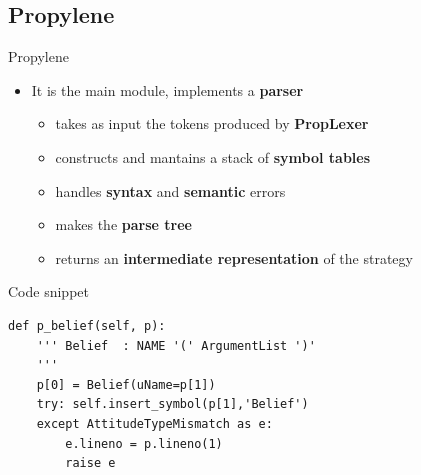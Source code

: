 \subsection{Propylene}
\begin{frame}[fragile]{Propylene}
  \begin{itemize}
  \item It is the main module, implements a {\bf parser}
    \begin{itemize}
    \item takes as input the tokens produced by {\bf PropLexer}
    \item constructs and mantains a stack of {\bf symbol tables}
    \item handles {\bf syntax} and {\bf semantic} errors
    \item makes the {\bf parse tree}
    \item returns an {\bf intermediate representation} of the strategy
    \end{itemize}
  \end{itemize}
  \begin{exampleblock}{Code snippet}
\begin{verbatim}
def p_belief(self, p):
    ''' Belief  : NAME '(' ArgumentList ')'
    '''
    p[0] = Belief(uName=p[1])
    try: self.insert_symbol(p[1],'Belief')
    except AttitudeTypeMismatch as e:
        e.lineno = p.lineno(1)
        raise e
\end{verbatim}
  \end{exampleblock}  
\end{frame}
